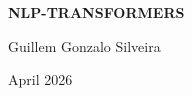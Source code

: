 \begin{titlepage}
    \centering
    \vspace*{4cm}
    {\huge \bfseries NLP-TRANSFORMERS \par}
    \vspace{1.5cm}
    {\Large Guillem Gonzalo Silveira \par}
    \vspace{1.5cm}
    {\large April 2026 \par}
    \vfill
    \conteoTotal
    \vspace{1cm}
\end{titlepage}